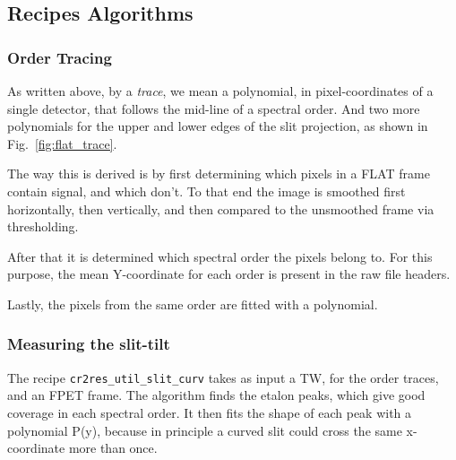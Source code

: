 \subsection{Recipes Algorithms} 
\label{sec:algorithms-recipes}



\subsubsection{Order Tracing}
\label{sec:ordertrace}

As written above, by a \emph{trace}, we mean a polynomial, in pixel-coordinates of a single detector, that follows the mid-line of a spectral order. And two more polynomials for the upper and lower edges of the slit projection, as shown in Fig.~\ref{fig:flat_trace}.

The way this is derived is by first determining which pixels in a FLAT frame contain signal, and which don't. To that end the image is smoothed first horizontally, then vertically, and then compared to the unsmoothed frame via thresholding.

After that it is determined which spectral order the pixels belong to. For this purpose, the mean Y-coordinate for each order is present in the raw file headers.

Lastly, the pixels from the same order are fitted with a polynomial.


\subsubsection{Measuring the slit-tilt}
\label{sec:tilt}

The recipe \verb!cr2res_util_slit_curv! takes as input a TW, for the order
traces, and an FPET frame. The algorithm finds the etalon peaks, which give good
coverage in each spectral order. It then fits the shape of each peak with a
polynomial P(y), because in principle a curved slit could cross the same
x-coordinate more than once.

